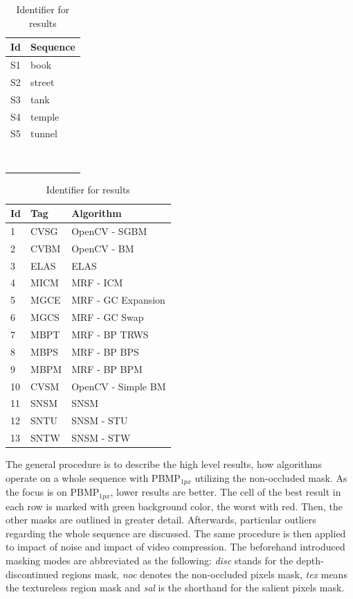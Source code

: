 \begin{table}[h!]
\centering
\begin{tabular}{ll}
  \hline
  \textbf{Id} & \textbf{Sequence} \\ \hline \hline
  S1 & book \\
  S2 & street \\
  S3 & tank \\
  S4 & temple \\
  S5 & tunnel \\
  & \\
  & \\
  & \\
  & \\
  & \\
  & \\
  & \\
  & \\
  \hline
\end{tabular}
\quad
\begin{tabular}{lll}
  \hline
  \textbf{Id} & \textbf{Tag} & \textbf{Algorithm} \\ \hline \hline
  1 & CVSG & OpenCV - SGBM \\
  2 & CVBM & OpenCV - BM \\
  3 & ELAS & ELAS \\
  4 & MICM & MRF - ICM \\
  5 & MGCE & MRF - GC Expansion \\
  6 & MGCS & MRF - GC Swap \\
  7 & MBPT & MRF - BP TRWS \\
  8 & MBPS & MRF - BP BPS \\
  9 & MBPM & MRF - BP BPM \\
  10 & CVSM & OpenCV - Simple BM \\
  11 & SNSM & SNSM \\
  12 & SNTU & SNSM - STU \\
  13 & SNTW & SNSM - STW \\
  \hline
\end{tabular}
\caption{Identifier for results}
\label{tab:identifier1}
\end{table}

\noindent The general procedure is to describe the high level results, how algorithms operate on a whole sequence with PBMP$_{1px}$ utilizing the non-occluded mask.
As the focus is on PBMP$_{1px}$, lower results are better.
The cell of the best result in each row is marked with green background color, the worst with red.
Then, the other masks are outlined in greater detail.
Afterwards, particular outliers regarding the whole sequence are discussed.
The same procedure is then applied to impact of noise and impact of video compression.
The beforehand introduced masking modes are abbreviated as the following: \textit{disc} stands for the depth-discontinued regions mask, \textit{noc} denotes the non-occluded pixels mask, \textit{tex} means the textureless region mask and \textit{sal} is the shorthand for the salient pixels mask.

